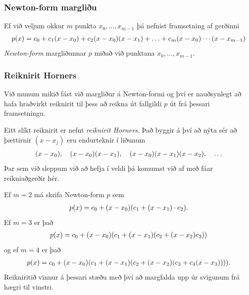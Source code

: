 \documentclass[a4paper,10pt,icelandic]{sphinxmanual}
\begin{document}

\subsubsection{Newton-form margliðu}
\label{kafli03:index-4}\label{kafli03:newton-form-margliu}
Ef við veljum okkur \(m\) punkta \(x_0, \ldots, x_{m-1}\) þá
nefnist framsetning af gerðinni
\begin{gather}
\begin{split}p(x) = c_0 + c_1(x-x_0) + c_2(x-x_0)(x-x_1)
    + \ldots + c_m(x-x_0)\cdots(x-x_{m-1})\end{split}\notag
\end{gather}
\emph{Newton-form} margliðunnar \(p\) miðað við punktana
\(x_0, \ldots,
x_{m-1}\).


\subsubsection{Reiknirit Horners}
\label{kafli03:reiknirit-horners}\label{kafli03:index-5}
Við munum mikið fást við margliður á Newton-formi og því er nauðsynlegt
að hafa hraðvirkt reiknirit til þess að reikna út fallgildi \(p\) út
frá þessari framsetningu.

Eitt slíkt reiknirit er nefnt \emph{reiknirit Horners}. Það byggir á því að
nýta sér að þættirnir \((x-x_j)\) eru endurteknir í liðunum
\begin{gather}
\begin{split}(x-x_0), \quad (x-x_0)(x-x_1),
    \quad (x-x_0)(x-x_1)(x-x_2), \quad \ldots\end{split}\notag
\end{gather}
Þar sem við sleppum við að hefja í veldi þá komumst við af með fáar
reikniaðgerðir hér.

Ef \(m = 2\) má skrifa Newton-form \(p\) sem
\begin{gather}
\begin{split}p(x) = c_0 + (x-x_0)(c_1 + (x-x_1) \cdot c_2).\end{split}\notag
\end{gather}
Ef \(m = 3\) er það
\begin{gather}
\begin{split}p(x) = c_0 + (x-x_0)(c_1 + (x-x_1)(c_2 + (x-x_2)c_3))\end{split}\notag
\end{gather}
og ef \(m = 4\) er það
\begin{gather}
\begin{split}p(x) = c_0 + (x-x_0)(c_1 + (x-x_1)(c_2 + (x-x_2)
    (c_3 + c_4(x-x_3)))).\end{split}\notag
\end{gather}
Reikniritið vinnur á þessari stæðu með því að margfalda upp úr svigunum
frá hægri til vinstri.
\end{document}
